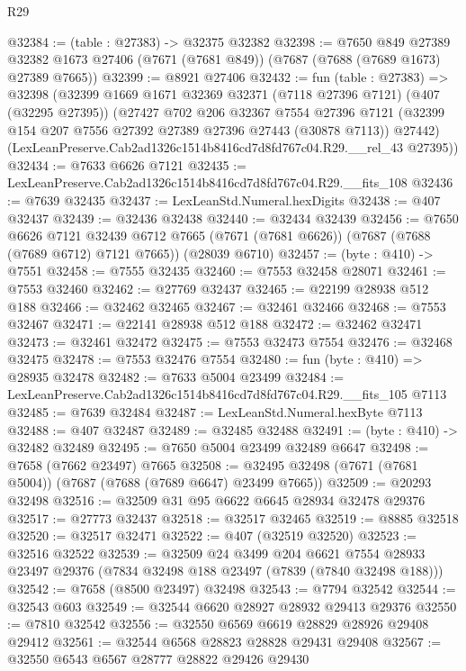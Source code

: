 \begin{lexlean}{R29}
\begin{coremodule}
@32384 := (table : @27383) -> @32375 @32382
@32398 := @7650
    @849
    @27389
    @32382
    @1673
    @27406
    (@7671 (@7681 @849))
    (@7687 (@7688 (@7689 @1673) @27389 @7665))
@32399 := @8921 @27406
@32432 := fun (table : @27383) =>
  @32398
    (@32399
      @1669
      @1671
      @32369
      @32371
      (@7118 @27396 @7121)
      (@407 (@32295 @27395))
      (@27427
        @702
        @206
        @32367
        @7554
        @27396
        @7121
        (@32399 @154 @207 @7556 @27392 @27389 @27396 @27443 (@30878 @7113))
        @27442)
      (LexLeanPreserve.Cab2ad1326c1514b8416cd7d8fd767c04.R29.__rel_43 @27395))
@32434 := @7633 @6626 @7121
@32435 := LexLeanPreserve.Cab2ad1326c1514b8416cd7d8fd767c04.R29.__fits_108
@32436 := @7639 @32435
@32437 := LexLeanStd.Numeral.hexDigits
@32438 := @407 @32437
@32439 := @32436 @32438
@32440 := @32434 @32439
@32456 := @7650
    @6626
    @7121
    @32439
    @6712
    @7665
    (@7671 (@7681 @6626))
    (@7687 (@7688 (@7689 @6712) @7121 @7665))
    (@28039 @6710)
@32457 := (byte : @410) -> @7551
@32458 := @7555 @32435
@32460 := @7553 @32458 @28071
@32461 := @7553 @32460
@32462 := @27769 @32437
@32465 := @22199 @28938 @512 @188
@32466 := @32462 @32465
@32467 := @32461 @32466
@32468 := @7553 @32467
@32471 := @22141 @28938 @512 @188
@32472 := @32462 @32471
@32473 := @32461 @32472
@32475 := @7553 @32473 @7554
@32476 := @32468 @32475
@32478 := @7553 @32476 @7554
@32480 := fun (byte : @410) => @28935 @32478
@32482 := @7633 @5004 @23499
@32484 := LexLeanPreserve.Cab2ad1326c1514b8416cd7d8fd767c04.R29.__fits_105 @7113
@32485 := @7639 @32484
@32487 := LexLeanStd.Numeral.hexByte @7113
@32488 := @407 @32487
@32489 := @32485 @32488
@32491 := (byte : @410) -> @32482 @32489
@32495 := @7650 @5004 @23499 @32489 @6647
@32498 := @7658 (@7662 @23497) @7665
@32508 := @32495 @32498 (@7671 (@7681 @5004)) (@7687 (@7688 (@7689 @6647) @23499 @7665))
@32509 := @20293 @32498
@32516 := @32509 @31 @95 @6622 @6645 @28934 @32478 @29376
@32517 := @27773 @32437
@32518 := @32517 @32465
@32519 := @8885 @32518
@32520 := @32517 @32471
@32522 := @407 (@32519 @32520)
@32523 := @32516 @32522
@32539 := @32509
    @24
    @3499
    @204
    @6621
    @7554
    @28933
    @23497
    @29376
    (@7834 @32498 @188 @23497 (@7839 (@7840 @32498 @188)))
@32542 := @7658 (@8500 @23497) @32498
@32543 := @7794 @32542
@32544 := @32543 @603
@32549 := @32544 @6620 @28927 @28932 @29413 @29376
@32550 := @7810 @32542
@32556 := @32550 @6569 @6619 @28829 @28926 @29408 @29412
@32561 := @32544 @6568 @28823 @28828 @29431 @29408
@32567 := @32550 @6543 @6567 @28777 @28822 @29426 @29430

\end{coremodule}
\end{lexlean}
